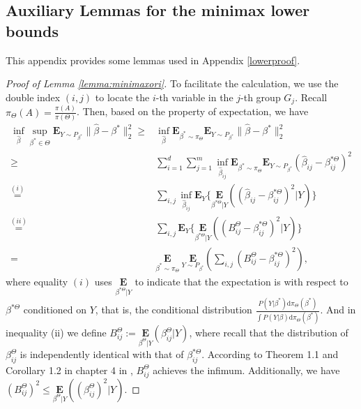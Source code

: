 \documentclass[12pt]{article}
\newtheorem{proof}{Proof}
\begin{document}
\begin{appendix}
\section{Auxiliary Lemmas for the minimax lower bounds}\label{appD}

This appendix provides some lemmas used in Appendix \ref{lowerproof}.

\begin{proof}[Proof of Lemma \ref{lemma:minimaxori}]
To facilitate the calculation, we use the double index $(i,j)$ to locate the $i$-th variable in the $j$-th group $G_j$.
Recall $\pi_{\Theta}(A) = \frac{\pi(A)}{\pi({\Theta})}$. 
Then, based on the property of expectation, we have
\begin{equation}\label{1siineq}
 \begin{aligned}
\inf_{\hat \beta} \sup_{\beta^* \in  {\Theta}} 
    \mathbf{E}_{Y\sim P_{\beta^*}} \|\hat \beta - \beta^*\|_2^2 
\ge & \inf_{\hat \beta} \mathbf E_{\beta^* \sim \pi_{\Theta} } 
    \mathbf{E}_{Y\sim P_{\beta^*} } \|\hat \beta - \beta^*\|_2^2 \\
\ge & \sum_{i=1}^d\sum_{j=1}^m \inf_{\hat \beta_{ij}} \mathbf E_{\beta^* \sim \pi_{\Theta} } 
    \mathbf{E}_{Y\sim P_{\beta^*} } \left( \hat \beta_{ij}- \beta_{ij}^{*{\Theta} }\right)^2 \\
\overset{(i)}{=}& \sum_{i,j} \inf_{\hat \beta_{ij} } 
    \mathbf E_{Y} \Bigg\{ \underset{\beta^{*{\Theta}}|Y}{\mathbf{E}}
    \left( \left( \hat \beta_{ij} - \beta_{ij}^{*{\Theta}} \right)^2 \Big| Y \right)\Bigg\}\\
\overset{(ii)}{ = }& \sum_{i,j} \mathbf E_{Y } \Bigg\{
    \underset{\beta^{*{\Theta}} |Y}{\mathbf{E}} \left( \left( 
    B_{ij}^{\Theta} - \beta_{ij}^{*{\Theta}} \right)^2 \Big| Y \right)\Bigg\}\\
=& \underset{\beta^* \sim \pi_{\Theta}}{\mathbf E}~\underset{Y \sim P_{\beta^*} }{\mathbf E}  
    \left( \sum_{i,j} \left(B_{ij}^{\Theta} - \beta_{ij}^{*{\Theta}} \right)^2 \right),
\end{aligned}
\end{equation}
where equality $(i)$ uses $\underset{\beta^{*{\Theta}}|Y}{\mathbf{E}}$ to indicate that the expectation is with respect to $\beta^{*{\Theta}}$ conditioned on $Y$, that is, the conditional distribution $\frac{ P(Y|\beta^*) \mathrm d \pi_{\Theta}(\beta^*)  }{ \int P(Y|\beta) \mathrm d \pi_{\Theta}(\beta^*) }$. 
And in inequality (ii) we define $B_{ij}^{\Theta} := \underset{\beta^{{\Theta}}|Y}{\mathbf{E} } (\beta_{ij}^{{\Theta}}|Y)$, where recall that the distribution of $\beta_{ij}^{{\Theta}}$ is independently identical with that of $\beta_{ij}^{*{\Theta}}$. 
According to Theorem 1.1 and Corollary 1.2 in chapter 4 in \cite{LE06}, $B_{ij}^{\Theta}$ achieves the infimum.
Additionally, we have 
$(B_{ij}^{\Theta})^2 \le 
\underset{\beta^{{\Theta}}|Y}{\mathbf{E}} \left( \left(\beta_{ij}^{{\Theta}}\right)^2\Big| Y \right)$.


\end{proof}
\end{appendix}
\end{document}
